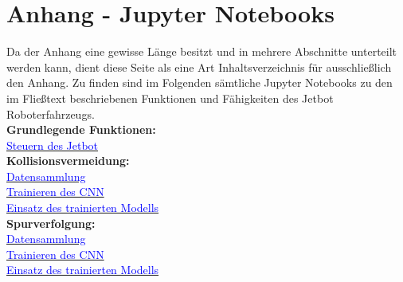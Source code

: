 \section{Anhang - Jupyter Notebooks} \label{sec:anhang}

Da der Anhang eine gewisse Länge besitzt und in mehrere Abschnitte unterteilt werden kann, dient diese Seite als eine Art Inhaltsverzeichnis für ausschließlich den Anhang. Zu finden sind im Folgenden sämtliche Jupyter Notebooks zu den im Fließtext beschriebenen Funktionen und Fähigkeiten des Jetbot Roboterfahrzeugs.\\

\textbf{Grundlegende Funktionen:}\\
\hyperlink{page.27}{\textcolor{blue}{Steuern des Jetbot}}\\

\textbf{Kollisionsvermeidung:}\\
\hyperlink{page.2}{\textcolor{blue}{Datensammlung}}\\
\hyperlink{page.2}{\textcolor{blue}{Trainieren des CNN}}\\
\hyperlink{page.2}{\textcolor{blue}{Einsatz des trainierten Modells}}\\

\textbf{Spurverfolgung:}\\
\hyperlink{page.2}{\textcolor{blue}{Datensammlung}}\\
\hyperlink{page.2}{\textcolor{blue}{Trainieren des CNN}}\\
\hyperlink{page.2}{\textcolor{blue}{Einsatz des trainierten Modells}}\\

